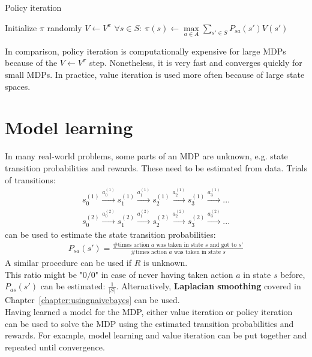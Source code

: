 \documentclass{report}
\begin{document}
\begin{algorithm}[h!]
\caption{Policy iteration}
\label{ref:policyiterationalgorithm}
\begin{algorithmic}
\State Initialize $\pi$ randomly
\Repeat
\State $V\gets V^{\pi}$
\State $\forall s\in S:\:\pi(s)\gets  \max\limits_{a\in A} \sum_{s'\in S} P_{sa}(s')V(s')$
\end{algorithmic}
\end{algorithm}

In comparison, policy iteration is computationally expensive for large MDPs because of the $V\gets V^{\pi}$ step. Nonetheless, it is very fast and converges quickly for small MDPs. In practice, value iteration is used more often because of large state spaces.

\section{Model learning}
In many real-world problems, some parts of an MDP are unknown, e.g. state transition probabilities and rewards. These need to be estimated from data. Trials of transitions:
\begin{align*}
s_0^{(1)}\xrightarrow{a_0^{(1)}}s_1^{(1)}\xrightarrow{a_1^{(1)}}s_2^{(1)}\xrightarrow{a_2^{(1)}}s_3^{(1)}\xrightarrow{a_3^{(1)}}...
\end{align*}
\begin{align*}
s_0^{(2)}\xrightarrow{a_0^{(2)}}s_1^{(2)}\xrightarrow{a_1^{(2)}}s_2^{(2)}\xrightarrow{a_2^{(2)}}s_3^{(2)}\xrightarrow{a_3^{(2)}}...
\end{align*}
can be used to estimate the state transition probabilities:
\begin{align*}
P_{sa}(s')=\frac{\#\mbox{times action } a\mbox{ was taken in state } s \mbox{ and got to }s'} {\#\mbox{times action } a\mbox{ was taken in state } s}
\end{align*}
A similar procedure can be used if $R$ is unknown. \\
This ratio might be "$0/0$" in case of never having taken action $a$ in state $s$ before, $P_{as}(s')$ can be estimated: $\frac{1}{\vert S\vert}$. Alternatively, {\bf Laplacian smoothing} covered in Chapter~\ref{chapter:usingnaivebayes} can be used. \\
Having learned a model for the MDP, either value iteration or policy iteration can be used to solve the MDP using the estimated transition probabilities and rewards. For example, model learning and value iteration can be put together and repeated until convergence.
\end{document}
